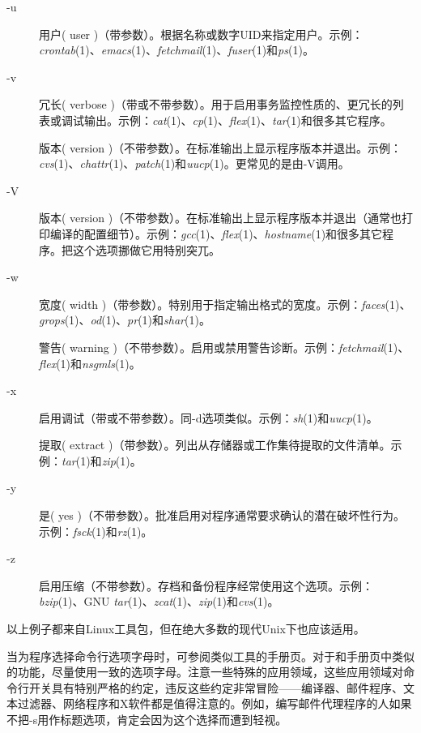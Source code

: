 \documentclass[12pt,oneside]{book}
\begin{document}
\begin{common-format}
\begin{description}
\item[-u] 用户( user )（带参数）。根据名称或数字UID来指定用户。示例：\textit{crontab}(1)、\textit{emacs}(1)、\textit{fetchmail}(1)、\textit{fuser}(1)和\textit{ps}(1)。

\item[-v] 冗长( verbose )（带或不带参数）。用于启用事务监控性质的、更冗长的列表或调试输出。示例：\textit{cat}(1)、\textit{cp}(1)、\textit{flex}(1)、\textit{tar}(1)和很多其它程序。

版本( version )（不带参数）。在标准输出上显示程序版本并退出。示例：\textit{cvs}(1)、\textit{chattr}(1)、\textit{patch}(1)和\textit{uucp}(1)。更常见的是由-V调用。

\item[-V] 版本( version )（不带参数）。在标准输出上显示程序版本并退出（通常也打印编译的配置细节）。示例：\textit{gcc}(1)、\textit{flex}(1)、\textit{hostname}(1)和很多其它程序。把这个选项挪做它用特别突兀。

\item[-w] 宽度( width )（带参数）。特别用于指定输出格式的宽度。示例：\textit{faces}(1)、\textit{grops}(1)、\textit{od}(1)、\textit{pr}(1)和\textit{shar}(1)。

警告( warning )（不带参数）。启用或禁用警告诊断。示例：\textit{fetchmail}(1)、\textit{flex}(1)和\textit{nsgmls}(1)。

\item[-x] 启用调试（带或不带参数）。同-d选项类似。示例：\textit{sh}(1)和\textit{uucp}(1)。
    
提取( extract )（带参数）。列出从存储器或工作集待提取的文件清单。示例：\textit{tar}(1)和\textit{zip}(1)。

\item[-y] 是( yes )（不带参数）。批准启用对程序通常要求确认的潜在破坏性行为。示例：\textit{fsck}(1)和\textit{rz}(1)。

\item[-z] 启用压缩（不带参数）。存档和备份程序经常使用这个选项。示例：\textit{bzip}(1)、GNU \textit{tar}(1)、\textit{zcat}(1)、\textit{zip}(1)和\textit{cvs}(1)。
\end{description}

以上例子都来自Linux工具包，但在绝大多数的现代Unix下也应该适用。

当为程序选择命令行选项字母时，可参阅类似工具的手册页。对于和手册页中类似的功能，尽量使用一致的选项字母。注意一些特殊的应用领域，这些应用领域对命令行开关具有特别严格的约定，违反这些约定非常冒险——编译器、邮件程序、文本过滤器、网络程序和X软件都是值得注意的。例如，编写邮件代理程序的人如果不把-s用作标题选项，肯定会因为这个选择而遭到轻视。


\end{common-format}
\end{document}
